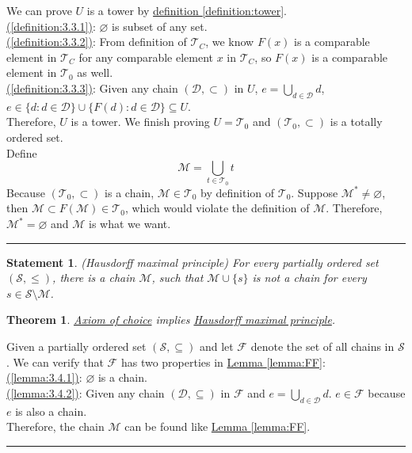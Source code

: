 \documentclass{article}
\numberwithin{equation}{section}
\theoremstyle{plain} %
\newtheorem{theorem}[equation]{Theorem}
\newtheorem{statement}[equation]{Statement}
\theoremstyle{definition}
\theoremstyle{remark}
\newenvironment{proof}{{\bf Proof:}}{\hfill\rule{2mm}{2mm}}
\begin{document}
\begin{proof}
We can prove $U$ is a tower by \hyperref[definition:tower]{definition  \ref*{definition:tower}}.  \\
\hyperref[definition:3.3.1]{(\ref*{definition:3.3.1})}: $\varnothing$ is subset of any set. \\  
\hyperref[definition:3.3.2]{(\ref*{definition:3.3.2})}: From definition of $\mathcal{T}_C$, we know $F(x)$ is a comparable element in $\mathcal{T}_C$ for any comparable element $x$ in $\mathcal{T}_C$, so $F(x)$ is a comparable element in $\mathcal{T}_0$ as well. \\
\hyperref[definition:3.3.3]{(\ref*{definition:3.3.3})}: Given any chain $(\mathcal{D}, \subset)$ in $U$, $e = \bigcup_{d \in \mathcal{D}}d$, $e \in \{d: d \in \mathcal{D}\} \cup \{ F(d): d \in \mathcal{D} \} \subseteq U$.\\
Therefore, $U$ is a tower. We finish proving $U = \mathcal{T}_0$ and $(\mathcal{T}_0, \subset)$ is a totally ordered set.  \\
Define  
$$\mathcal{M} = \bigcup_{t \in \mathcal{T}_0}t $$
Because $(\mathcal{T}_0, \subset)$ is a chain, $\mathcal{M} \in \mathcal{T}_0$ by definition of $\mathcal{T}_0$. Suppose $\mathcal{M}^*\neq \varnothing$, then $\mathcal{M} \subset F(\mathcal{M}) \in \mathcal{T}_0$, which would violate the definition of $\mathcal{M}$. Therefore, $\mathcal{M}^*= \varnothing$ and $\mathcal{M}$ is what we want. 
\end{proof}

\begin{statement}
\label{statement:Hausdorff maximal principle}
\textup{(Hausdorff maximal principle)} \textit{For every partially ordered set $(\mathcal{S}, \leq)$, there is a chain $\mathcal{M}$, such that $\mathcal{M} \cup \{s\}$ is not a chain for every $s \in \mathcal{S} \setminus \mathcal{M}$.}
\end{statement}

\begin{theorem}
\hyperref[statement:Axiom of choice]{Axiom of choice} implies \hyperref[statement:Hausdorff maximal principle]{Hausdorff maximal principle}.
\end{theorem}

\begin{proof}
Given a partially ordered set $(\mathcal{S}, \subseteq)$ and let $\mathcal{F}$ denote the set of all chains in $\mathcal{S}$. We can verify that $\mathcal{F}$ has two properties in \hyperref[lemma:FF]{Lemma \ref*{lemma:FF}}: \\
\hyperref[lemma:3.4.1]{(\ref*{lemma:3.4.1})}: $\varnothing$ is a chain. \\  
\hyperref[lemma:3.4.2]{(\ref*{lemma:3.4.2})}: Given any chain $(\mathcal{D}, \subseteq)$ in $\mathcal{F}$ and $e = \bigcup_{d \in \mathcal{D}}d$. $e \in \mathcal{F}$ because $e$ is also a chain.\\
Therefore, the chain $\mathcal{M}$ can be found like \hyperref[lemma:FF]{Lemma \ref*{lemma:FF}}. 
\end{proof}
\end{document}
